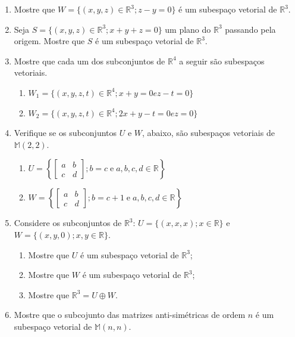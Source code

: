 \begin{enumerate}

\item  Mostre que $W=\{ ( x, y, z) \in \mathbb{R}^3; z-y=0 \}$ é um  subespaço  vetorial de $\mathbb{R}^3$.

\item Seja $S=\{ (x,y,z) \in \mathbb{R}^3; x+y+z=0\}$  um  plano do $\mathbb{R}^3$  passando pela origem. Mostre que $S$ é um subespaço vetorial  de $\mathbb{R}^3$.


\item  Mostre que cada um dos subconjuntos de $\mathbb{R}^4$ a seguir são subespaços vetoriais.

\begin{enumerate}[label=(\alph*)]
\item $W_1=\{ ( x, y, z, t) \in \mathbb{R}^4; x+y=0 e z-t = 0\}$
\item $W_2=\{ ( x, y, z, t) \in \mathbb{R}^4; 2x+y-t=0 e z = 0\}$
\end{enumerate}

\item Verifique se os subconjuntos $U$ e $W$, abaixo, são subespaços vetoriais de $\mathbb{M}(2,2)$.
\begin{enumerate}[label=(\alph*)]
\item $U=\left\{ \begin{bmatrix}  a & b\\ c & d \end{bmatrix}; b=c \; \text{e} \; a,b,c,d \in \mathbb{R}\right\}$
\item $W=\left\{ \begin{bmatrix}  a & b\\ c & d \end{bmatrix}; b=c+1 \; \text{e} \; a,b,c,d \in \mathbb{R}\right\}$
\end{enumerate}

\item Considere os  subconjuntos de $\mathbb{R}^3$: $U=\{(x, x, x); x \in \mathbb{R} \}$  e $W=\{(x, y, 0); x, y \in \mathbb{R} \}$.
\begin{enumerate}[label=(\alph*)]
\item Mostre que $U$ é um subespaço vetorial   de $\mathbb{R}^3$;
\item Mostre que $W$ é um subespaço vetorial   de $\mathbb{R}^3$;
\item Mostre que $\mathbb{R}^3= U \oplus W$.
\end{enumerate}

\item Mostre que o subcojunto das matrizes anti-simétricas de ordem $n$  é um subespaço vetorial de  $\mathbb{M}(n,n)$.


\end{enumerate}
